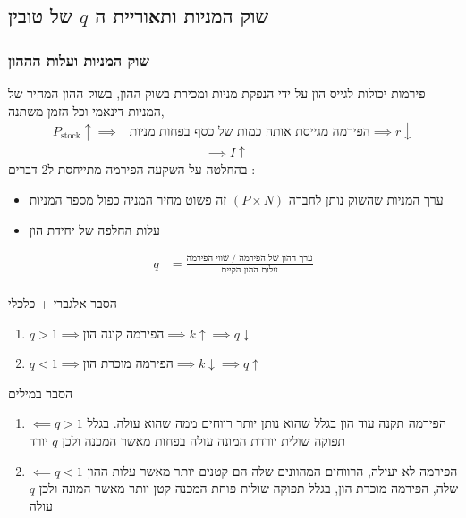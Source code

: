 \documentclass[usenames,dvipsnames, 10pt]{beamer}
\begin{document}
\begin{RTL}
\section{שוק המניות ותאוריית ה $q$ של טובין}
\begin{frame}[allowframebreaks]
    \frametitle{שוק המניות ועלות הההון}
    פירמות יכולות לגייס הון על ידי הנפקת מניות ומכירת בשוק ההון, בשוק ההון המחיר של המניות דינאמי וכל הזמן משתנה,
    \begin{align*}
        P_{\text{stock}} \uparrow \implies &\text{הפירמה מגייסת אותה כמות של כסף בפחות מניות} \implies r \downarrow  \\
        & \qquad \qquad \qquad \implies I \uparrow
    \end{align*}
    בהחלטה על השקעה הפירמה מתייחסת ל2 דברים : 
    \begin{itemize}
        \item ערך המניות שהשוק נותן לחברה $\left(P \times N \right)$ זה פשוט מחיר המניה כפול מספר המניות
        \item עלות החלפה של יחידת הון
    \end{itemize}
    \begin{align*}
    q &= \frac{\text{ערך ההון של הפירמה / שווי הפירמה}}{\text{עלות ההון הקיים}}  \\  
    \end{align*}
    \framebreak
    \begin{block}{הסבר אלגברי + כלכלי}
        \begin{enumerate}
            \item $q > 1 \implies \text{הפירמה קונה הון} \implies k \uparrow  \implies q \downarrow$
            \item $q < 1 \implies \text{הפירמה מוכרת הון}  \implies k \downarrow \implies q \uparrow$
        \end{enumerate}

    \end{block}
    \begin{block}{הסבר במילים}
        \begin{enumerate}
            \item $\impliedby q>1$ הפירמה תקנה עוד הון בגלל שהוא נותן יותר רווחים ממה שהוא עולה. בגלל תפוקה שולית יורדת המונה עולה בפחות מאשר המכנה ולכן $q$ יורד
            \item $\impliedby q<1$ הפירמה לא יעילה, הרווחים המהוונים שלה הם קטנים יותר מאשר עלות ההון שלה, הפירמה מוכרת הון, בגלל תפוקה שולית פוחת המכנה קטן יותר מאשר המונה ולכן $q$ עולה 
        \end{enumerate}
    \end{block}
   


\end{frame}
\end{RTL}
\end{document}
